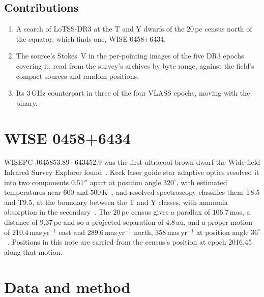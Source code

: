 \documentclass[3p,11pt]{elsarticle}
\begin{document}
\subsection{Contributions}
\begin{enumerate}[leftmargin=*,itemsep=1pt]
\item A search of LoTSS-DR3 at the T and Y dwarfs of the $20$\,pc census north of the
equator, which finds one, WISE 0458+6434.
\item The source's Stokes~V in the per-pointing images of the five DR3 epochs covering it,
read from the survey's archives by byte range, against the field's compact sources and
random positions.
\item Its $3$\,GHz counterpart in three of the four VLASS epochs, moving with the binary.
\end{enumerate}

\section{WISE 0458+6434}\label{sec:target}

WISEPC J045853.89+643452.9 was the first ultracool brown dwarf the Wide-field Infrared
Survey Explorer found~\cite{Mainzer2011}. Keck laser guide star adaptive optics resolved
it into two components $0.51''$ apart at position angle $320^\circ$, with estimated
temperatures near $600$ and $500$\,K~\cite{Gelino2011}, and resolved spectroscopy
classifies them T8.5 and T9.5, at the boundary between the T and Y classes, with ammonia
absorption in the secondary~\cite{Burgasser2012}. The $20$\,pc census gives a parallax
of $106.7$\,mas, a distance of $9.37$\,pc and so a projected separation of $4.8$\,au, and
a proper motion of $210.4$\,mas\,yr$^{-1}$ east and $289.6$\,mas\,yr$^{-1}$ north,
$358$\,mas\,yr$^{-1}$ at position angle $36^\circ$~\cite{Kirkpatrick2021}. Positions in
this note are carried from the census's position at epoch 2016.45 along that motion.

\section{Data and method}\label{sec:method}
\end{document}
